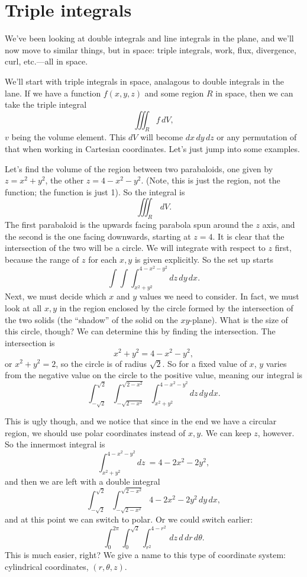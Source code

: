 \section{Triple integrals}

We've been looking at double integrals and line integrals in the plane, and we'll now move to similar things, but in space: triple integrals, work, flux, divergence, curl, etc.---all in space.

We'll start with triple integrals in space, analagous to double integrals in the lane. If we have a function $f(x,y,z)$ and some region $R$ in space, then we can take the triple integral
\[ \iiint_R f\,dV, \]
$v$ being the volume element. This $dV$ will become $dx\,dy\,dz$ or any permutation of that when working in Cartesian coordinates. Let's just jump into some examples.

\bex
Let's find the volume of the region between two parabaloids, one given by $z=x^2 + y^2$, the other $z = 4-x^2-y^2$. (Note, this is just the region, not the function; the function is just 1). So the integral is
\[ \iiint_R \, dV. \]
The first parabaloid is the upwards facing parabola spun around the $z$ axis, and the second is the one facing downwards, starting at $z=4$. It is clear that the intersection of the two will be a circle. We will integrate with respect to $z$ first, because the range of $z$ for each $x,y$ is given explicitly. So the set up starts
\[ \int \int \int_{x^2+y^2}^{4-x^2-y^2} dz\,dy\,dx. \] 
Next, we must decide which $x$ and $y$ values we need to consider. In fact, we must look at all $x,y$ in the region enclosed by the circle formed by the intersection of the two solids (the ``shadow'' of the solid on the $xy$-plane). What is the size of this circle, though? We can determine this by finding the intersection.  The intersection is 
\[ x^2 + y^2 = 4 - x^2 - y^2, \]
or $x^2 + y^2 = 2$, so the circle is of radius $\sqrt{2}$. So for a fixed value of $x$, $y$ varies from the negative value on the circle to the positive value, meaning our integral is
\[ \int_{-\sqrt2}^{\sqrt2} \int_{-\sqrt{2-x^2}}^{\sqrt{2-x^2}} \int_{x^2+y^2}^{4-x^2-y^2} dz\,dy\,dx. \]

This is ugly though, and we notice that since in the end we have a circular region, we should use polar coordinates instead of $x,y$. We can keep $z$, however. So the innermost integral is
\[ \int_{x^2+y^2}^{4-x^2-y^2} dz\ = 4 - 2x^2 - 2y^2, \]
and then we are left with a double integral
\[ \int_{-\sqrt2}^{\sqrt2} \int_{-\sqrt{2-x^2}}^{\sqrt{2-x^2}} 4 - 2x^2 - 2y^2 \,dy\,dx, \]
and at this point we can switch to polar. Or we could switch earlier:
\[ \int_0^{2\pi} \int_0^{\sqrt2} \int_{r^2}^{4-r^2} \, dz \, d\,dr\,d\theta. \]
This is much easier, right? We give a name to this type of coordinate system: cylindrical coordinates, $(r,\theta,z)$. 
\eex

